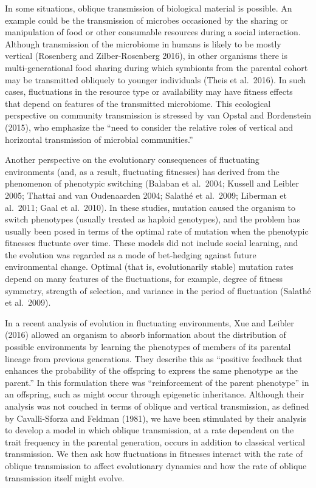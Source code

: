 In some situations, oblique transmission of biological material is possible. An example could be the transmission of microbes occasioned by the sharing or manipulation of food or other consumable resources during a social interaction. Although transmission of the microbiome in humans is likely to be mostly vertical (Rosenberg and Zilber-Rosenberg 2016), in other organisms there is multi-generational food sharing during which symbionts from the parental cohort may be transmitted obliquely to younger individuals (Theis et al.\ 2016). In such cases, fluctuations in the resource type or availability may have fitness effects that depend on features of the transmitted microbiome. This ecological perspective on community transmission is stressed by van Opstal and Bordenstein (2015), who emphasize the ``need to consider the relative roles of vertical and horizontal transmission of microbial communities.''

Another perspective on the evolutionary consequences of fluctuating environments (and, as a result, fluctuating fitnesses) has derived from the phenomenon of phenotypic switching (Balaban et al.\ 2004; Kussell and Leibler 2005; Thattai and van Oudenaarden 2004; Salath\'e et al.\ 2009; Liberman et al.\ 2011; Gaal et al.\ 2010). In these studies, mutation caused the organism to switch phenotypes (usually treated as haploid genotypes), and the problem has usually been posed in terms of the optimal rate of mutation when the phenotypic fitnesses fluctuate over time. These models did not include social learning, and the evolution was regarded as a mode of bet-hedging against future environmental change. Optimal (that is, evolutionarily stable) mutation rates depend on many features of the fluctuations, for example,  degree of fitness symmetry, strength of selection, and variance in the period of fluctuation (Salath\'e et al.\ 2009).

In a recent analysis of evolution in fluctuating environments, Xue and Leibler (2016) allowed an organism to absorb information about the distribution of possible environments by learning the phenotypes of members of its parental lineage from previous generations. They describe this as ``positive feedback that enhances the probability of the offspring to express the same phenotype as the parent.'' In this formulation there was ``reinforcement of the parent phenotype'' in an offspring, such as might occur through epigenetic inheritance. Although their analysis was not couched in terms of oblique and vertical transmission, as defined by Cavalli-Sforza and Feldman (1981), we have been stimulated by their analysis to develop a model in which oblique transmission, at a rate dependent on the trait frequency in the parental generation, occurs in addition to classical vertical transmission. We then ask how fluctuations in fitnesses interact with the rate of oblique transmission to affect evolutionary dynamics and how the rate of oblique transmission itself might evolve. 


